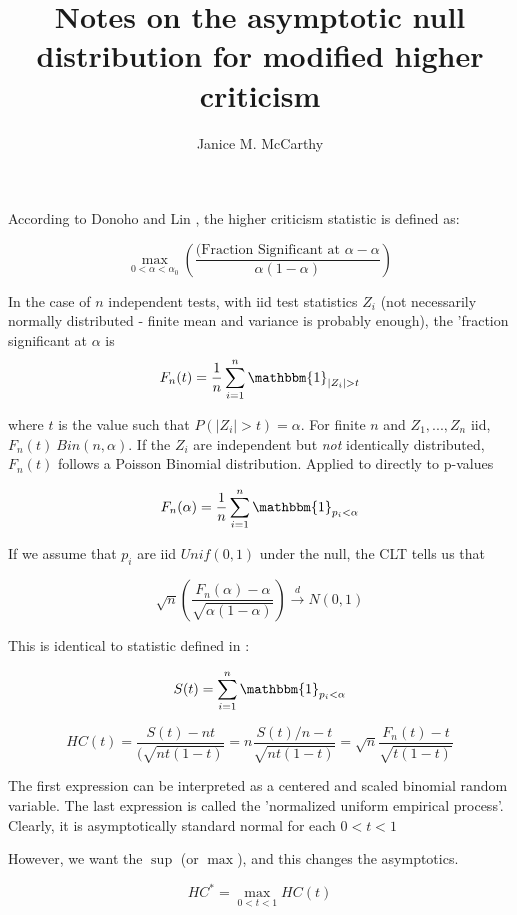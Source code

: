 \documentclass[11pt]{article}
\title{\sc Notes on the asymptotic null distribution for modified higher criticism}
\author{Janice M. McCarthy}
\begin{document}
According to Donoho and Lin \cite{HCHM}, the higher criticism statistic is defined as:

$$\max_{0<\alpha<\alpha_0}\left(
\frac{(\textrm{Fraction Significant at } \alpha - \alpha}{\alpha (1 - \alpha)}\right)$$

In the case of $n$ independent tests, with iid test statistics $Z_i$ (not necessarily normally distributed - finite mean and variance is probably enough), the 'fraction significant at $\alpha$ is
$$ F_n(t) = \frac1n \sum_{i=1}^n \mathbbm{1}_{|Z_i|>t}$$

where $t$ is the value such that $P(|Z_i|>t) =\alpha$. For finite $n$ and $Z_1,...,Z_n$ iid, $F_n(t) ~ Bin(n,\alpha)$. If the $Z_i$ are independent but \emph{not} identically distributed, $F_n(t)$ follows a Poisson Binomial distribution. Applied to directly to p-values

$$ F_n(\alpha) = \frac1n \sum_{i=1}^n \mathbbm{1}_{p_i < \alpha}$$

If we assume that $p_i$ are iid $Unif(0,1)$ under the null, the CLT tells us that 

$$\sqrt{n}\left(\frac{F_n(\alpha) - \alpha}{\sqrt{\alpha(1-\alpha)}}\right) \xrightarrow{d} N(0,1)$$

This is identical to statistic defined in \cite{Xihong}:

$$ S(t) = \sum_{i=1}^n \mathbbm{1}_{p_i < \alpha}$$

$$HC(t) = \frac{S(t)-n t}{(\sqrt{nt(1-t)}} = n\frac{S(t)/n - t}{\sqrt{nt(1-t)}} 
=   \sqrt{n}\frac{F_n(t) - t}{\sqrt{t(1-t)}}$$

The first expression can be interpreted as a centered and scaled binomial random variable. The last expression is called the 'normalized uniform empirical process'. Clearly, it is asymptotically standard normal for each $0<t<1$

However, we want the $\sup$ (or $\max$), and this changes the asymptotics. 

$$HC^* = \max_{0<t<1} HC(t)$$



\end{document}
